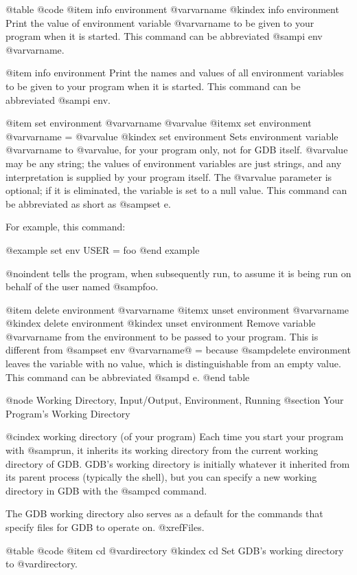@table @code
@item info environment @var{varname}
@kindex info environment
Print the value of environment variable @var{varname} to be given to
your program when it is started.  This command can be abbreviated
@samp{i env @var{varname}}.

@item info environment
Print the names and values of all environment variables to be given to
your program when it is started.  This command can be abbreviated
@samp{i env}.

@item set environment @var{varname} @var{value}
@itemx set environment @var{varname} = @var{value}
@kindex set environment
Sets environment variable @var{varname} to @var{value}, for your program
only, not for GDB itself.  @var{value} may be any string; the values of
environment variables are just strings, and any interpretation is
supplied by your program itself.  The @var{value} parameter is optional;
if it is eliminated, the variable is set to a null value.  This command
can be abbreviated as short as @samp{set e}.

For example, this command:

@example
set env USER = foo
@end example

@noindent
tells the program, when subsequently run, to assume it is being run
on behalf of the user named @samp{foo}.

@item delete environment @var{varname}
@itemx unset environment @var{varname}
@kindex delete environment
@kindex unset environment
Remove variable @var{varname} from the environment to be passed to your
program.  This is different from @samp{set env @var{varname}@ =} because
@samp{delete environment} leaves the variable with no value, which is
distinguishable from an empty value.  This command can be abbreviated
@samp{d e}.
@end table

@node Working Directory, Input/Output, Environment, Running
@section Your Program's Working Directory

@cindex working directory (of your program)
Each time you start your program with @samp{run}, it inherits its
working directory from the current working directory of GDB.  GDB's
working directory is initially whatever it inherited from its parent
process (typically the shell), but you can specify a new working
directory in GDB with the @samp{cd} command.

The GDB working directory also serves as a default for the commands
that specify files for GDB to operate on.  @xref{Files}.

@table @code
@item cd @var{directory}
@kindex cd
Set GDB's working directory to @var{directory}.

